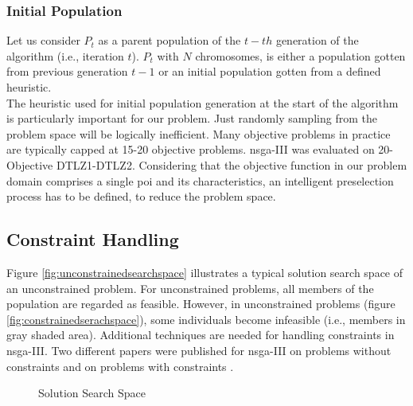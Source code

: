 \subsubsection{Initial Population}
Let us consider $P_t$ as a parent population of the $t-th$ generation of the algorithm (i.e., iteration $t$). $P_t$ with $N$ chromosomes, is either a population gotten from previous generation $t-1$ or an initial population gotten from a defined heuristic.\\ 
The heuristic used for initial population generation at the start of the algorithm is particularly important for our problem. Just randomly sampling from the problem space will be logically inefficient. Many objective problems in practice are typically capped at 15-20 objective problems. \Gls{nsga}-III was evaluated on 20-Objective DTLZ1-DTLZ2. Considering that the objective function in our problem domain comprises a single \gls{poi} and its characteristics, an intelligent preselection process has to be defined, to reduce the problem space.

\subsection{Constraint Handling}
Figure \ref{fig:unconstrainedsearchspace} illustrates a typical solution search space of an unconstrained problem. For unconstrained problems, all members of the population are regarded as feasible. However, in unconstrained problems (figure \ref{fig:constrainedserachspace}), some individuals become infeasible (i.e., members in gray shaded area). Additional techniques are needed for handling constraints in \gls{nsga}-III. Two different papers were published for \gls{nsga}-III on problems without constraints \parencite{Deb2013AnConstraints} and on problems with constraints \parencite{Jain2013AnApproach}. 

\begin{figure}[h!]
\centering
{}\qquad
{}
\caption{Solution Search Space}
\label{fig:constrainedvsunconstrained}
\end{figure}

